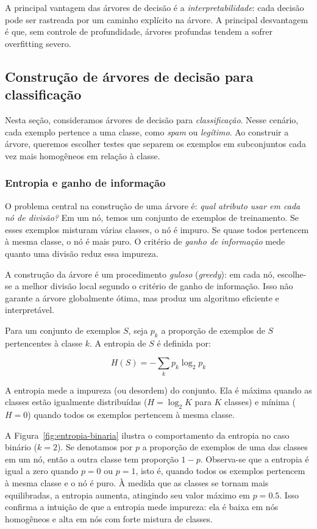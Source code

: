 \documentclass[12pt,a4paper]{article}
\begin{document}
A principal vantagem das árvores de decisão é a \emph{interpretabilidade}: cada decisão pode ser rastreada por um caminho explícito na árvore. A principal desvantagem é que, sem controle de profundidade, árvores profundas tendem a sofrer overfitting severo.

\subsection{Construção de árvores de decisão para classificação}
\label{subsec:entropia}

Nesta seção, consideramos árvores de decisão para \emph{classificação}. Nesse cenário, cada exemplo pertence a uma classe, como \emph{spam} ou \emph{legítimo}. Ao construir a árvore, queremos escolher testes que separem os exemplos em subconjuntos cada vez mais homogêneos em relação à classe.

\subsubsection{Entropia e ganho de informação}

O problema central na construção de uma árvore é: \emph{qual atributo usar em cada nó de divisão?} Em um nó, temos um conjunto de exemplos de treinamento. Se esses exemplos misturam várias classes, o nó é impuro. Se quase todos pertencem à mesma classe, o nó é mais puro. O critério de \emph{ganho de informação} mede quanto uma divisão reduz essa impureza.

A construção da árvore é um procedimento \emph{guloso} (\textit{greedy}): em cada nó, escolhe-se a melhor divisão local segundo o critério de ganho de informação. Isso não garante a árvore globalmente ótima, mas produz um algoritmo eficiente e interpretável.

Para um conjunto de exemplos $S$, seja $p_k$ a proporção de exemplos de $S$ pertencentes à classe $k$. A entropia de $S$ é definida por:

\[
H(S) = -\sum_k p_k \log_2 p_k
\]

A entropia mede a impureza (ou desordem) do conjunto. Ela é máxima quando as classes estão igualmente distribuídas ($H = \log_2 K$ para $K$ classes) e mínima ($H = 0$) quando todos os exemplos pertencem à mesma classe.

A Figura~\ref{fig:entropia-binaria} ilustra o comportamento da entropia no caso binário ($k=2$). Se denotamos por $p$ a proporção de exemplos de uma das classes em um nó, então a outra classe tem proporção $1-p$. Observa-se que a entropia é igual a zero quando $p=0$ ou $p=1$, isto é, quando todos os exemplos pertencem à mesma classe e o nó é puro. À medida que as classes se tornam mais equilibradas, a entropia aumenta, atingindo seu valor máximo em $p=0.5$. Isso confirma a intuição de que a entropia mede impureza: ela é baixa em nós homogêneos e alta em nós com forte mistura de classes.
\end{document}
